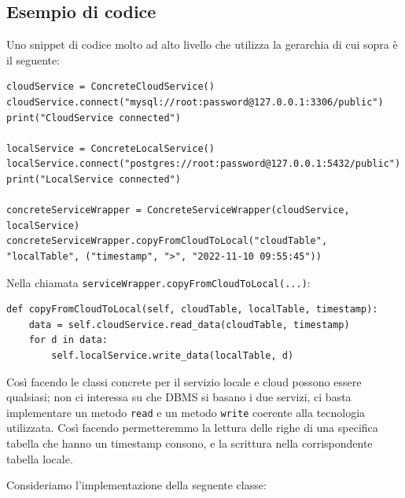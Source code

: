 \documentclass[a4paper]{article}
\begin{document}
\subsection{Esempio di codice}

Uno snippet di codice molto ad alto livello che utilizza la gerarchia di cui
sopra è il seguente:
\begin{lstlisting}
cloudService = ConcreteCloudService()
cloudService.connect("mysql://root:password@127.0.0.1:3306/public")
print("CloudService connected")

localService = ConcreteLocalService()
localService.connect("postgres://root:password@127.0.0.1:5432/public")
print("LocalService connected")

concreteServiceWrapper = ConcreteServiceWrapper(cloudService, localService)    
concreteServiceWrapper.copyFromCloudToLocal("cloudTable", "localTable", ("timestamp", ">", "2022-11-10 09:55:45"))
\end{lstlisting}
Nella chiamata \texttt{serviceWrapper.copyFromCloudToLocal(...)}:
\begin{lstlisting}
def copyFromCloudToLocal(self, cloudTable, localTable, timestamp):
    data = self.cloudService.read_data(cloudTable, timestamp)
    for d in data:
        self.localService.write_data(localTable, d)
\end{lstlisting}
Così facendo le classi concrete per il servizio locale e cloud possono essere
qualsiasi; non ci interessa su che DBMS si basano i due servizi, ci basta
implementare un metodo \texttt{read} e un metodo \texttt{write} coerente alla
tecnologia utilizzata.
Così facendo permetteremmo la lettura delle righe di una specifica tabella che
hanno un timestamp consono, e la scrittura nella corrispondente tabella locale.

Consideriamo l'implementazione della seguente classe:
\end{document}
